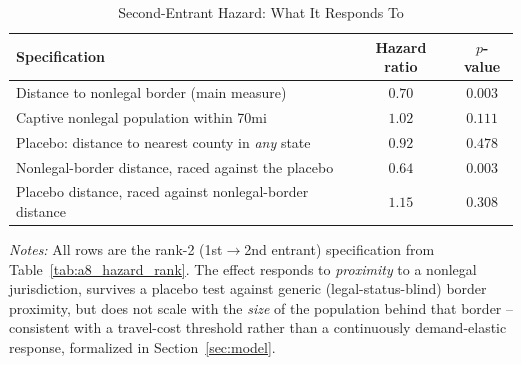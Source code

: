 \begin{table}[htbp]
\centering
\caption{Second-Entrant Hazard: What It Responds To}
\label{tab:a8_mechanism}
\begin{tabular}{lcc}
\toprule
Specification & Hazard ratio & $p$-value \\
\midrule
Distance to nonlegal border (main measure) & $0.70$ & $0.003$ \\
Captive nonlegal population within 70mi & $1.02$ & $0.111$ \\
\midrule
Placebo: distance to nearest county in \emph{any} state & $0.92$ & $0.478$ \\
\quad Nonlegal-border distance, raced against the placebo & $0.64$ & $0.003$ \\
\quad Placebo distance, raced against nonlegal-border distance & $1.15$ & $0.308$ \\
\bottomrule
\end{tabular}
\begin{minipage}{0.95\textwidth}
\vspace{0.3em}
\footnotesize
\textit{Notes:} All rows are the rank-2 (1st$\to$2nd entrant) specification from
Table~\ref{tab:a8_hazard_rank}. The effect responds to \emph{proximity} to a nonlegal jurisdiction, survives
a placebo test against generic (legal-status-blind) border proximity, but does not scale with the
\emph{size} of the population behind that border -- consistent with a travel-cost threshold rather than a
continuously demand-elastic response, formalized in Section~\ref{sec:model}.
\end{minipage}
\end{table}

